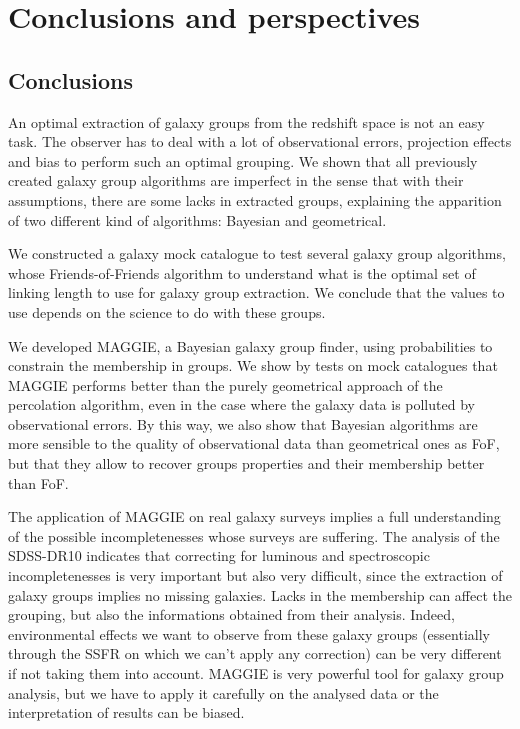 \chapter{Conclusions and perspectives}
\label{cha:conclusions_and_perspectives}

\section{Conclusions}
\label{sec:conclusions}

An optimal extraction of galaxy groups from the redshift space is not an easy
task. The observer has to deal with a lot of observational errors, projection
effects and bias to perform such an optimal grouping. We shown that all
previously created galaxy group algorithms are imperfect in the sense that with
their assumptions, there are some lacks in extracted groups, explaining the
apparition of two different kind of algorithms: Bayesian and geometrical.

We constructed a galaxy mock catalogue to test several galaxy group algorithms,
whose Friends-of-Friends algorithm to understand what is the optimal set of
linking length to use for galaxy group extraction. We conclude that the values
to use depends on the science to do with these groups.

We developed MAGGIE, a Bayesian galaxy group finder, using probabilities to
constrain the membership in groups. We show by tests on mock catalogues that
MAGGIE performs better than the purely geometrical approach of the percolation
algorithm, even in the case where the galaxy data is polluted by observational
errors. By this way, we also show that Bayesian algorithms are more sensible to
the quality of observational data than geometrical ones as FoF, but that they
allow to recover groups properties and their membership better than FoF.

The application of MAGGIE on real galaxy surveys implies a full understanding
of the possible incompletenesses whose surveys are suffering. The analysis of
the SDSS-DR10 indicates that correcting for luminous and spectroscopic
incompletenesses is very important but also very difficult, since the
extraction of galaxy groups implies no missing galaxies. Lacks in the
membership can affect the grouping, but also the informations obtained from
their analysis. Indeed, environmental effects we want to observe from these
galaxy groups (essentially through the SSFR on which we can't apply any
correction) can be very different if not taking them into account. MAGGIE is
very powerful tool for galaxy group analysis, but we have to apply it carefully
on the analysed data or the interpretation of results can be biased.

